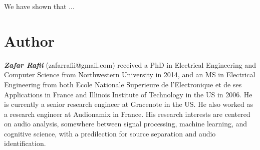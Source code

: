 \documentclass[journal]{IEEEtran}
\begin{document}
We have shown that ...




\section{Author}

\textit{\textbf{Zafar Rafii}} (zafarrafii@gmail.com) received a PhD in Electrical Engineering and Computer Science from Northwestern University in 2014, and an MS in Electrical Engineering from both Ecole Nationale Superieure de l’Electronique et de ses Applications in France and Illinois Institute of Technology in the US in 2006. He is currently a senior research engineer at Gracenote in the US. He also worked as a research engineer at Audionamix in France. His research interests are centered on audio analysis, somewhere between signal processing, machine learning, and cognitive science, with a predilection for source separation and audio identification.



\end{document}
